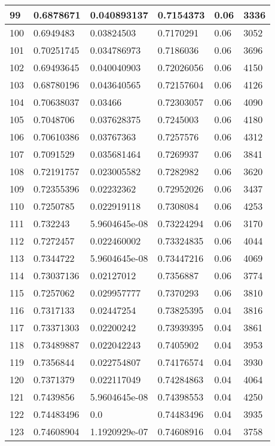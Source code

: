 \begin{longtable}{|l|l|l|l|l|l|}
99 & 0.6878671 & 0.040893137 & 0.7154373 & 0.06 & 3336 \\ \hline 
100 & 0.6949483 & 0.03824503 & 0.7170291 & 0.06 & 3052 \\ \hline 
101 & 0.70251745 & 0.034786973 & 0.7186036 & 0.06 & 3696 \\ \hline 
102 & 0.69493645 & 0.040040903 & 0.72026056 & 0.06 & 4150 \\ \hline 
103 & 0.68780196 & 0.043640565 & 0.72157604 & 0.06 & 4126 \\ \hline 
104 & 0.70638037 & 0.03466 & 0.72303057 & 0.06 & 4090 \\ \hline 
105 & 0.7048706 & 0.037628375 & 0.7245003 & 0.06 & 4180 \\ \hline 
106 & 0.70610386 & 0.03767363 & 0.7257576 & 0.06 & 4312 \\ \hline 
107 & 0.7091529 & 0.035681464 & 0.7269937 & 0.06 & 3841 \\ \hline 
108 & 0.72191757 & 0.023005582 & 0.7282982 & 0.06 & 3620 \\ \hline 
109 & 0.72355396 & 0.02232362 & 0.72952026 & 0.06 & 3437 \\ \hline 
110 & 0.7250785 & 0.022919118 & 0.7308084 & 0.06 & 4253 \\ \hline 
111 & 0.732243 & 5.9604645e-08 & 0.73224294 & 0.06 & 3170 \\ \hline 
112 & 0.7272457 & 0.022460002 & 0.73324835 & 0.06 & 4044 \\ \hline 
113 & 0.7344722 & 5.9604645e-08 & 0.73447216 & 0.06 & 4069 \\ \hline 
114 & 0.73037136 & 0.02127012 & 0.7356887 & 0.06 & 3774 \\ \hline 
115 & 0.7257062 & 0.029957777 & 0.7370293 & 0.06 & 3810 \\ \hline 
116 & 0.7317133 & 0.02447254 & 0.73825395 & 0.04 & 3816 \\ \hline 
117 & 0.73371303 & 0.02200242 & 0.73939395 & 0.04 & 3861 \\ \hline 
118 & 0.73489887 & 0.022042243 & 0.7405902 & 0.04 & 3953 \\ \hline 
119 & 0.7356844 & 0.022754807 & 0.74176574 & 0.04 & 3930 \\ \hline 
120 & 0.7371379 & 0.022117049 & 0.74284863 & 0.04 & 4064 \\ \hline 
121 & 0.7439856 & 5.9604645e-08 & 0.74398553 & 0.04 & 4250 \\ \hline 
122 & 0.74483496 & 0.0 & 0.74483496 & 0.04 & 3935 \\ \hline 
123 & 0.74608904 & 1.1920929e-07 & 0.74608916 & 0.04 & 3758 \\ \hline 

\end{longtable}
